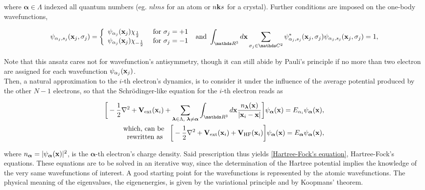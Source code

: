 \documentclass{homework}
\begin{document}
where $\bm{\alpha} \in \Lambda$ indexed all quantum numbers (eg. $nlms$ for an atom or $n{\bf k}s$ for a crystal). Further conditions are imposed on the one-body wavefunctions,

\begin{align}
     \psi_{\alpha_j, s_j}(\x_j, \sigma_j) =  \left\{ \begin{array}{lcc}
         \psi_{\alpha_j}(\x_j) \chi_{\frac{1}{2}} & \textnormal{ for } \sigma_j = +1 \\
         \psi_{\alpha_j}(\x_j) \chi_{-\frac{1}{2}} & \textnormal{ for } \sigma_j = -1   
     \end{array} \right. \textnormal{ and }
     \xmeasure \spinmeasure \psi_{\alpha_j, s_j}^{*}(\x_j, \sigma_j) \psi_{\alpha_j, s_j}(\x_j, \sigma_j) = 1,
     \label{HF normalization}
\end{align}

 Note that this ansatz cares not for wavefunction's antisymmetry, though it can still abide by Pauli's principle if no more than two electron are assigned for each wavefunction $\psi_{\alpha_j}({\bf x}_j)$. \\
 
Then, a natural approximation to the $i$-th electron's dynamics, is to consider it under the influence of the average potential produced by the other $N-1$ electrons, so that the Schr\"odinger-like equation for the $i$-th electron reads as 

\begin{align}
    \bigg[-\frac{1}{2} \nabla^2 + {\bf V}_{\textnormal{ext}}(\x_i) + \sum_{\bm{\lambda} \in \Lambda, \blanky \bm{\lambda} \neq \bm{\alpha}} \int_{\R^3} d\x \frac{n_{\bm{\lambda}}(\x)}{|\x_i - \x|} \bigg] \psi_{\bm{\alpha}}(\x) = E_{\alpha_i}  \psi_{\bm{\alpha}}(\x), \\
    \begin{array}{c}
         \textnormal{which, can be }  \\
         \textnormal{rewritten as}
    \end{array}
    \bigg[-\frac{1}{2} \nabla^2 + {\bf V}_{\textnormal{ext}}(\x_i) + {\bf V}_{\textnormal{HF}}(\x_i) \bigg] \psi_{\bm{\alpha}}(\x) = E_{\bm{\alpha}} \psi_{\bm{\alpha}}(\x),
    \label{Hartree-Fock's equation}
\end{align}

where $n_{\bm{\alpha}} = |\psi_{\bm{\alpha}}({\bf x})|^2$, is the $\bm{\alpha}$-th electron's charge density. Said prescription thus yields \eqref{Hartree-Fock's equation}, Hartree-Fock's equations. These equations are to be solved in an iterative way, since the determination of the Hartree potential implies the knowledge of the very same wavefunctions of interest. A good starting point for the wavefunctions is represented by the atomic wavefunctions. The physical meaning of the eigenvalues, the eigenenergies, is given by the variational principle and by Koopmans' theorem. \\
\end{document}
